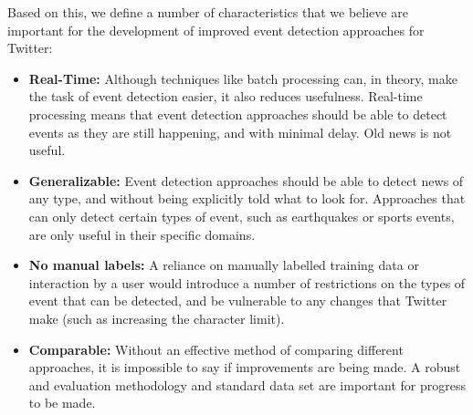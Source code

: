 Based on this, we define a number of characteristics that we believe are important for the development of improved event detection approaches for Twitter:
\begin{itemize}

	\item \textbf{Real-Time:} Although techniques like batch processing can, in theory, make the task of event detection easier, it also reduces usefulness.
	Real-time processing means that event detection approaches should be able to detect events as they are still happening, and with minimal delay.
	Old news is not useful. \\

	\item \textbf{Generalizable:} Event detection approaches should be able to detect news of any type, and without being explicitly told what to look for. Approaches that can only detect certain types of event, such as earthquakes or sports events, are only useful in their specific domains. \\

	\item \textbf{No manual labels:} A reliance on manually labelled training data or interaction by a user would introduce a number of restrictions on the types of event that can be detected, and be vulnerable to any changes that Twitter make (such as increasing the character limit). \\

	\item \textbf{Comparable:} Without an effective method of comparing different approaches, it is impossible to say if improvements are being made. A robust and  evaluation methodology and standard data set are important for progress to be made.  \\

\end{itemize}

